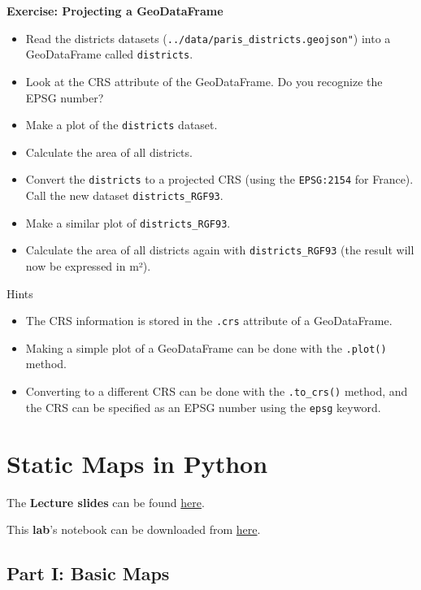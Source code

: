 \documentclass[
  letterpaper,
  DIV=11,
  numbers=noendperiod]{scrreprt}
\providecommand{\tightlist}{%
  \setlength{\itemsep}{0pt}\setlength{\parskip}{0pt}}\usepackage{longtable,booktabs,array}
\begin{document}
\textbf{Exercise: Projecting a GeoDataFrame}

\begin{itemize}
\tightlist
\item
  Read the districts datasets
  (\texttt{../data/paris\_districts.geojson"}) into a GeoDataFrame
  called \texttt{districts}.
\item
  Look at the CRS attribute of the GeoDataFrame. Do you recognize the
  EPSG number?
\item
  Make a plot of the \texttt{districts} dataset.
\item
  Calculate the area of all districts.
\item
  Convert the \texttt{districts} to a projected CRS (using the
  \texttt{EPSG:2154} for France). Call the new dataset
  \texttt{districts\_RGF93}.
\item
  Make a similar plot of \texttt{districts\_RGF93}.
\item
  Calculate the area of all districts again with
  \texttt{districts\_RGF93} (the result will now be expressed in m²).
\end{itemize}

Hints

\begin{itemize}
\tightlist
\item
  The CRS information is stored in the \texttt{.crs} attribute of a
  GeoDataFrame.
\item
  Making a simple plot of a GeoDataFrame can be done with the
  \texttt{.plot()} method.
\item
  Converting to a different CRS can be done with the \texttt{.to\_crs()}
  method, and the CRS can be specified as an EPSG number using the
  \texttt{epsg} keyword.
\end{itemize}


\chapter{Static Maps in Python}\label{static-maps-in-python}

The \textbf{Lecture slides} can be found
\href{https://github.com/GDSL-UL/wma/blob/main/lectures/w02.pdf}{here}.

This \textbf{lab}'s notebook can be downloaded from
\href{https://github.com/GDSL-UL/wma/blob/main/labs/w02_maps.ipynb}{here}.

\section{Part I: Basic Maps}\label{part-i-basic-maps}
\end{document}
